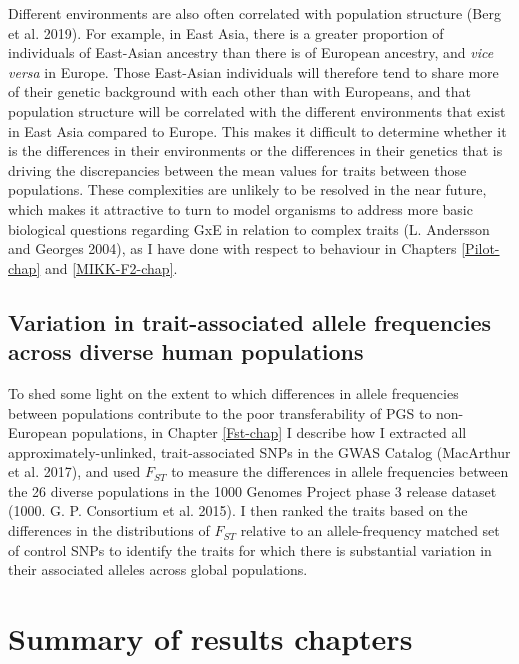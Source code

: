 \documentclass[
]{book}
\begin{document}
Different environments are also often correlated with population structure (Berg et al. 2019). For example, in East Asia, there is a greater proportion of individuals of East-Asian ancestry than there is of European ancestry, and \emph{vice versa} in Europe. Those East-Asian individuals will therefore tend to share more of their genetic background with each other than with Europeans, and that population structure will be correlated with the different environments that exist in East Asia compared to Europe. This makes it difficult to determine whether it is the differences in their environments or the differences in their genetics that is driving the discrepancies between the mean values for traits between those populations. These complexities are unlikely to be resolved in the near future, which makes it attractive to turn to model organisms to address more basic biological questions regarding GxE in relation to complex traits (L. Andersson and Georges 2004), as I have done with respect to behaviour in Chapters \ref{Pilot-chap} and \ref{MIKK-F2-chap}.

\hypertarget{variation-in-trait-associated-allele-frequencies-across-diverse-human-populations}{%
\subsection{Variation in trait-associated allele frequencies across diverse human populations}\label{variation-in-trait-associated-allele-frequencies-across-diverse-human-populations}}

To shed some light on the extent to which differences in allele frequencies between populations contribute to the poor transferability of PGS to non-European populations, in Chapter \ref{Fst-chap} I describe how I extracted all approximately-unlinked, trait-associated SNPs in the GWAS Catalog (MacArthur et al. 2017), and used \(F_{ST}\) to measure the differences in allele frequencies between the 26 diverse populations in the 1000 Genomes Project phase 3 release dataset (1000. G. P. Consortium et al. 2015). I then ranked the traits based on the differences in the distributions of \(F_{ST}\) relative to an allele-frequency matched set of control SNPs to identify the traits for which there is substantial variation in their associated alleles across global populations.

\hypertarget{summary-of-results-chapters}{%
\section{Summary of results chapters}\label{summary-of-results-chapters}}
\end{document}
